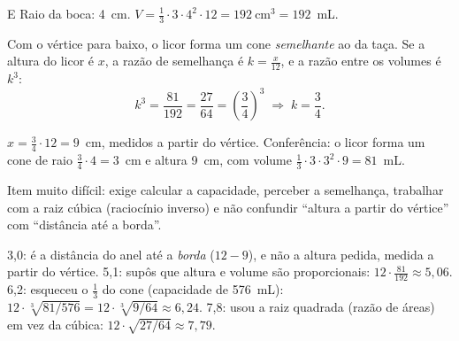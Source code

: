 \begin{resolucao}{E}
 Raio da boca: 4~cm.
$V = \frac13\cdot 3\cdot 4^2\cdot 12 = 192\ \text{cm}^3 = 192$~mL.

 Com o vértice para baixo, o licor
forma um cone \emph{semelhante} ao da taça. Se a altura do licor é $x$, a razão
de semelhança é $k = \frac{x}{12}$, e a razão entre os volumes é $k^3$:
\[
k^3 = \frac{81}{192} = \frac{27}{64} = \left(\frac34\right)^3
\;\Rightarrow\; k = \frac34 .
\]

 $x = \frac34\cdot 12 = 9$~cm, medidos a partir do
vértice. Conferência: o licor forma um cone de raio $\frac34\cdot 4 = 3$~cm e
altura 9~cm, com volume $\frac13\cdot 3\cdot 3^2\cdot 9 = 81$~mL.

Item muito difícil: exige calcular a capacidade, perceber a semelhança, trabalhar
com a raiz cúbica (raciocínio inverso) e não confundir “altura a partir do
vértice” com “distância até a borda”.

\begin{distratores}
 3,0: é a distância do anel até a \emph{borda} ($12 - 9$), e não a altura
pedida, medida a partir do vértice.
 5,1: supôs que altura e volume são proporcionais:
$12\cdot\frac{81}{192}\approx 5{,}06$.
 6,2: esqueceu o $\frac13$ do cone (capacidade de 576~mL):
$12\cdot\sqrt[3]{81/576} = 12\cdot\sqrt[3]{9/64}\approx 6{,}24$.
 7,8: usou a raiz quadrada (razão de áreas) em vez da cúbica:
$12\cdot\sqrt{27/64}\approx 7{,}79$.
\end{distratores}
\end{resolucao}
